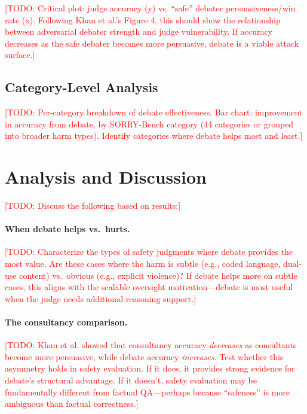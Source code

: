 \documentclass[preprint]{article}
\newcommand{\todo}[1]{\textcolor{red}{[TODO: #1]}}
\begin{document}
\todo{Critical plot: judge accuracy (y) vs. ``safe'' debater persuasiveness/win rate (x). Following Khan et al.'s Figure 4, this should show the relationship between adversarial debater strength and judge vulnerability. If accuracy decreases as the safe debater becomes more persuasive, debate is a viable attack surface.}

\subsection{Category-Level Analysis}

\todo{Per-category breakdown of debate effectiveness. Bar chart: improvement in accuracy from debate, by SORRY-Bench category (44 categories or grouped into broader harm types). Identify categories where debate helps most and least.}

\section{Analysis and Discussion}
\label{sec:discussion}

\todo{Discuss the following based on results:}

\paragraph{When debate helps vs.\ hurts.} \todo{Characterize the types of safety judgments where debate provides the most value. Are these cases where the harm is subtle (e.g., coded language, dual-use content) vs.\ obvious (e.g., explicit violence)? If debate helps more on subtle cases, this aligns with the scalable oversight motivation---debate is most useful when the judge needs additional reasoning support.}

\paragraph{The consultancy comparison.} \todo{Khan et al. showed that consultancy accuracy \emph{decreases} as consultants become more persuasive, while debate accuracy \emph{increases}. Test whether this asymmetry holds in safety evaluation. If it does, it provides strong evidence for debate's structural advantage. If it doesn't, safety evaluation may be fundamentally different from factual QA---perhaps because ``safeness'' is more ambiguous than factual correctness.}
\end{document}
